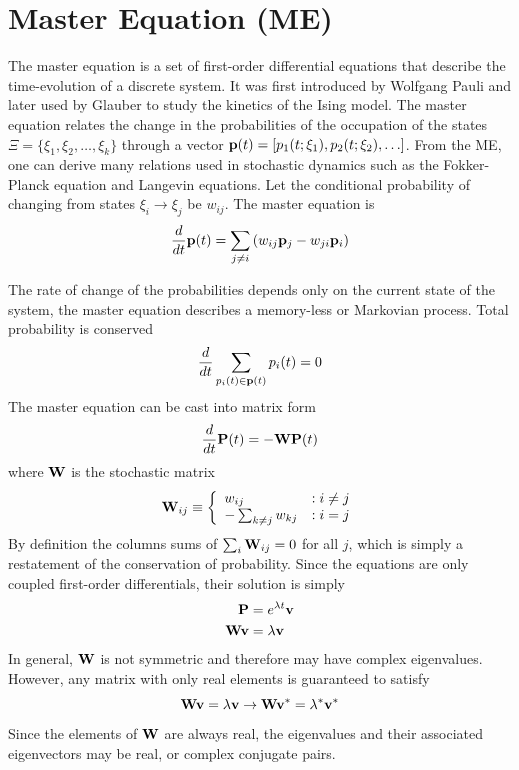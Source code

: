 \section{Master Equation (ME)}
\label{sec:master_equations}

The master equation is a set of first-order differential equations that describe the time-evolution of a discrete system. It was first introduced by Wolfgang Pauli\cite{pauli_1928_probleme} and later used by Glauber to study the kinetics of the Ising model.\cite{glauber_time-dependent_1963} The master equation relates the change in the probabilities of the occupation of the states $\Xi = \{\xi_1, \xi_2,\ldots, \xi_k \}$ through a vector ${\bf p}(t) = [ p_1(t; \xi_1), p_2(t; \xi_2), \ldots] $. From the ME, one can derive many relations used in stochastic dynamics such as the Fokker-Planck equation and Langevin equations. Let the conditional probability of changing from states $\xi_i \rightarrow \xi_j$ be $w_{ij}$. The master equation is
\begin{equation}
  \frac{d}{dt} {\bf p}(t) = \sum_{j \neq i} 
  \left(  w_{ij} {\bf p}_j - w_{ji} {\bf p}_i  \right)
\end{equation}

The rate of change of the probabilities depends only on the current state of the system, \ie the master equation describes a memory-less or Markovian process. Total probability is conserved
\begin{equation}
  \frac{d}{dt}  \sum_{p_i(t) \in {\bf p}(t)} p_i(t) = 0
\end{equation}
%
The master equation can be cast into matrix form
%
\begin{equation}
  \frac{d}{dt} {\bf P}(t) = - {\bf W} {\bf P}(t)
\end{equation}
%
where ${\bf W}$ is the stochastic matrix
%
\begin{equation}
  {\bf W}_{ij} \equiv
  \left \{ 
    \begin{array}{lr}
      w_{ij}                  & : i \neq j\\
      -\sum_{k \neq j} w_{kj} & : i = j
    \end{array}
   \right .
\end{equation}
%
By definition the columns sums of $\sum_{i} {\bf W}_{ij} = 0$ for all $j$, which is simply a restatement of the conservation of probability. Since the equations are only coupled first-order differentials, their solution is simply
\begin{align}
  {\bf P} &= e^{\lambda t} {\bf v}  \\
  {\bf W} {\bf v} &= \lambda {\bf v}
\end{align}
%
In general, ${\bf W}$ is not symmetric and therefore may have complex eigenvalues. However, any matrix with only real elements is guaranteed to satisfy
\begin{equation}
  {\bf W} {\bf v} = \lambda {\bf v} \rightarrow {\bf W} {\bf v}^* = \lambda^* {\bf v}^*
\end{equation}
Since the elements of ${\bf W}$ are always real, the eigenvalues and their associated eigenvectors may be real, or complex conjugate pairs.

